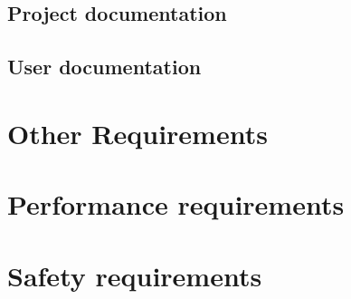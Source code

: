 \documentclass[10pt]{article}
\begin{document}
\lipsum[10]

\subsection{Project documentation}

\lipsum[10]

\subsection{User documentation}

\lipsum[10]



\section{Other Requirements}

\begin{appendices}

	\section{Performance requirements}

	\lipsum[10]

	\section{Safety requirements}

	\lipsum[10]

\end{appendices}
\end{document}
